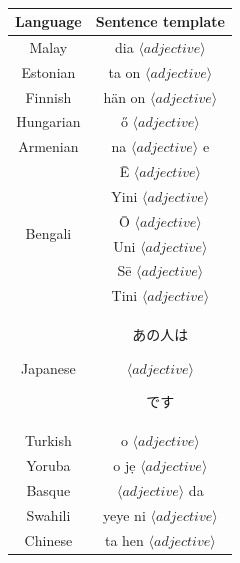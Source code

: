 \documentclass[fleqn,10pt]{article}
\begin{document}
\begin{table}[H]
\centering
\small{
	\begin{tabular}{|c|c|}
	\hline
	Language 	& Sentence template 													\\ \hline \hline
	Malay		& dia $\langle adjective \rangle$ 								\\ \hline
	Estonian	& ta on $\langle adjective \rangle$ 									\\ \hline
	Finnish		& hän on $\langle adjective \rangle$ 									\\ \hline
	Hungarian	& ő $\langle adjective \rangle$ 									\\ \hline
	Armenian	& na $\langle adjective \rangle$ e 									\\ \hline
	\multirow{6}{*}{Bengali}	& Ē $\langle adjective \rangle$				\\
								& Yini $\langle adjective \rangle$		\\
								& Ō $\langle adjective \rangle$				\\
								& Uni $\langle adjective \rangle$			\\
								& Sē $\langle adjective \rangle$			\\
								& Tini $\langle adjective \rangle$		\\ \hline
	Japanese	& \begin{CJK*}{UTF8}{min}あの人は\end{CJK*} $\langle adjective \rangle$ \begin{CJK*}{UTF8}{min}です\end{CJK*}		\\ \hline
	Turkish		& o $\langle adjective \rangle$ 									\\ \hline
	Yoruba		& o jẹ $\langle adjective \rangle$ 									\\ \hline
	Basque		& $\langle adjective \rangle$ da 										\\ \hline
	Swahili		& yeye ni $\langle adjective \rangle$ 									\\ \hline
	Chinese		& ta hen $\langle adjective \rangle$ 										\\ \hline
	\end{tabular}
	}
	\caption{}
	\label{tab:templates-adjectives}
\end{table}
\end{document}
